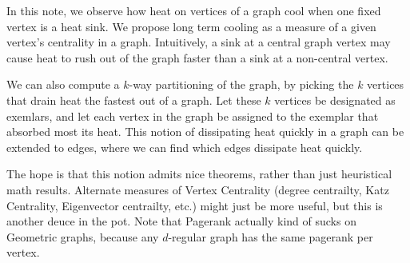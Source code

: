 In this note, we observe how heat on vertices of a graph cool when
one fixed vertex is a heat sink.
We propose long term cooling as a measure
of a given vertex's centrality in a graph.
Intuitively, a sink at a central graph
vertex may cause heat to rush
out of the graph faster than a sink at a non-central
vertex.

We can also compute a $k$-way
partitioning of the graph, by picking the $k$ vertices that drain
heat the fastest out of a graph. Let these $k$ vertices be
designated as exemlars, and let
each vertex in the graph be assigned to the
exemplar that absorbed most its heat.
This notion of dissipating heat quickly in a graph can be
extended to edges, where we can find which edges dissipate heat
quickly. 

The hope is that this notion admits nice theorems, rather than
just heuristical math results. Alternate measures of Vertex
Centrality (degree centrailty, Katz Centrality, Eigenvector
    centrailty, etc.) might just be more useful, but this is
another deuce in the pot. Note that Pagerank actually kind of
sucks on Geometric graphs, because any $d$-regular graph has the
same pagerank per vertex.

